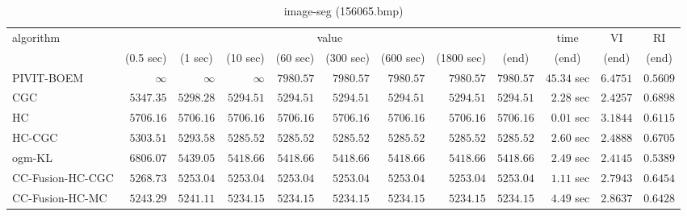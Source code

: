 \begin{table}[H]
\scriptsize
\centering
\caption{image-seg (156065.bmp)}
\label{tab:anytimetable-image-seg-156065.bmp}
\begin{tabular}{lrrrrrrrrrrr}
\toprule
           algorithm &                                   \multicolumn{8}{c}{value} & \multicolumn{1}{c}{time}    & \multicolumn{1}{c}{VI}  & \multicolumn{1}{c}{RI} \\  
\cmidrule(lr){2-9}\cmidrule(lr){10-10} \cmidrule(lr){11-11} \cmidrule(lr){12-12}   
                     & \multicolumn{1}{c}{(0.5 sec)} & \multicolumn{1}{c}{(1 sec)} & \multicolumn{1}{c}{(10 sec)} & \multicolumn{1}{c}{(60 sec)} & \multicolumn{1}{c}{(300 sec)} & \multicolumn{1}{c}{(600 sec)} & \multicolumn{1}{c}{(1800 sec)} & \multicolumn{1}{c}{(end)} & \multicolumn{1}{c}{(end)}    & \multicolumn{1}{c}{(end)}   & \multicolumn{1}{c}{(end)}  \\ \midrule 
          PIVIT-BOEM & $\infty$ & $\infty$ & $\infty$ & $      7980.57$ & $      7980.57$ & $      7980.57$ & $      7980.57$ & $      7980.57$ & $        45.34$ sec    & $       6.4751$  & $       0.5609$ \\ 
                 CGC & $      5347.35$ & $      5298.28$ & $      5294.51$ & $      5294.51$ & $      5294.51$ & $      5294.51$ & $      5294.51$ & $      5294.51$ & $         2.28$ sec    & $       2.4257$  & $       0.6898$ \\ 
                  HC & $      5706.16$ & $      5706.16$ & $      5706.16$ & $      5706.16$ & $      5706.16$ & $      5706.16$ & $      5706.16$ & $      5706.16$ & $         0.01$ sec    & $       3.1844$  & $       0.6115$ \\ 
              HC-CGC & $      5303.51$ & $      5293.58$ & $      5285.52$ & $      5285.52$ & $      5285.52$ & $      5285.52$ & $      5285.52$ & $      5285.52$ & $         2.60$ sec    & $       2.4888$  & $       0.6705$ \\ 
              ogm-KL & $      6806.07$ & $      5439.05$ & $      5418.66$ & $      5418.66$ & $      5418.66$ & $      5418.66$ & $      5418.66$ & $      5418.66$ & $         2.49$ sec    & $       2.4145$  & $       0.5389$ \\ 
    CC-Fusion-HC-CGC & $      5268.73$ & $      5253.04$ & $      5253.04$ & $      5253.04$ & $      5253.04$ & $      5253.04$ & $      5253.04$ & $      5253.04$ & $         1.11$ sec    & $       2.7943$  & $       0.6454$ \\ 
     CC-Fusion-HC-MC & $      5243.29$ & $      5241.11$ & $      5234.15$ & $      5234.15$ & $      5234.15$ & $      5234.15$ & $      5234.15$ & $      5234.15$ & $         4.49$ sec    & $       2.8637$  & $       0.6428$ \\ 

\end{tabular}
\end{table}
